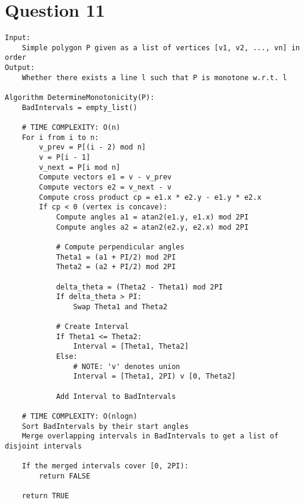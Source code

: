 \documentclass{article}
\begin{document}
\section*{Question 11}
\begin{verbatim}
Input: 
    Simple polygon P given as a list of vertices [v1, v2, ..., vn] in order
Output: 
    Whether there exists a line l such that P is monotone w.r.t. l

Algorithm DetermineMonotonicity(P):
    BadIntervals = empty_list()

    # TIME COMPLEXITY: O(n)
    For i from i to n:
        v_prev = P[(i - 2) mod n]
        v = P[i - 1]
        v_next = P[i mod n]
        Compute vectors e1 = v - v_prev
        Compute vectors e2 = v_next - v
        Compute cross product cp = e1.x * e2.y - e1.y * e2.x
        If cp < 0 (vertex is concave):
            Compute angles a1 = atan2(e1.y, e1.x) mod 2PI
            Compute angles a2 = atan2(e2.y, e2.x) mod 2PI

            # Compute perpendicular angles
            Theta1 = (a1 + PI/2) mod 2PI
            Theta2 = (a2 + PI/2) mod 2PI

            delta_theta = (Theta2 - Theta1) mod 2PI
            If delta_theta > PI:
                Swap Theta1 and Theta2

            # Create Interval
            If Theta1 <= Theta2:
                Interval = [Theta1, Theta2]
            Else:
                # NOTE: 'v' denotes union
                Interval = [Theta1, 2PI) v [0, Theta2]

            Add Interval to BadIntervals

    # TIME COMPLEXITY: O(nlogn)
    Sort BadIntervals by their start angles
    Merge overlapping intervals in BadIntervals to get a list of disjoint intervals

    If the merged intervals cover [0, 2PI):
        return FALSE

    return TRUE
\end{verbatim}

\newpage
\end{document}
